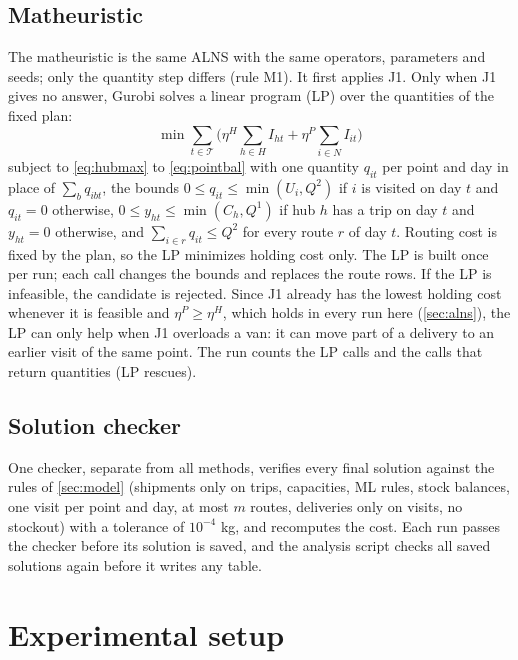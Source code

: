 \documentclass[11pt,a4paper]{article}
\begin{document}
\subsection{Matheuristic}\label{sec:mh}
The matheuristic is the same ALNS with the same operators, parameters and seeds; only
the quantity step differs (rule M1). It first applies J1. Only when J1 gives no answer, Gurobi
solves a linear program (LP) over the quantities of the fixed plan:
\begin{equation}
\min \sum_{t \in \mathcal{T}} \Big( \eta^H \sum_{h \in H} I_{ht} + \eta^P \sum_{i \in N} I_{it} \Big)
\label{eq:lp}
\end{equation}
subject to \eqref{eq:hubmax} to \eqref{eq:pointbal} with one quantity $q_{it}$ per point and day
in place of $\sum_b q_{ibt}$, the bounds $0 \le q_{it} \le \min(U_i, Q^2)$ if $i$ is visited on day
$t$ and $q_{it} = 0$ otherwise, $0 \le y_{ht} \le \min(C_h, Q^1)$ if hub $h$ has a trip on day $t$
and $y_{ht} = 0$ otherwise, and $\sum_{i \in r} q_{it} \le Q^2$ for every route $r$ of day $t$.
Routing cost is fixed by the plan, so the LP minimizes holding cost only. The LP is built once per
run; each call changes the bounds and replaces the route rows. If the LP is infeasible, the
candidate is rejected. Since J1 already has the lowest holding cost whenever it is feasible and
$\eta^P \ge \eta^H$, which holds in every run here (\cref{sec:alns}), the LP can only help when J1 overloads a van: it can move part of a delivery to
an earlier visit of the same point. The run counts the LP calls and the calls that return
quantities (LP rescues).

\subsection{Solution checker}\label{sec:checker}
One checker, separate from all methods, verifies every final solution against the rules of \cref{sec:model} (shipments only on trips, capacities, ML rules, stock balances, one visit per
point and day, at most $m$ routes, deliveries only on visits, no stockout) with a tolerance of
$10^{-4}$ kg, and recomputes the cost. Each run passes
the checker before its solution is saved, and the analysis script checks all \nRuns{} saved
solutions again before it writes any table.

\section{Experimental setup}\label{sec:setup}
\end{document}
